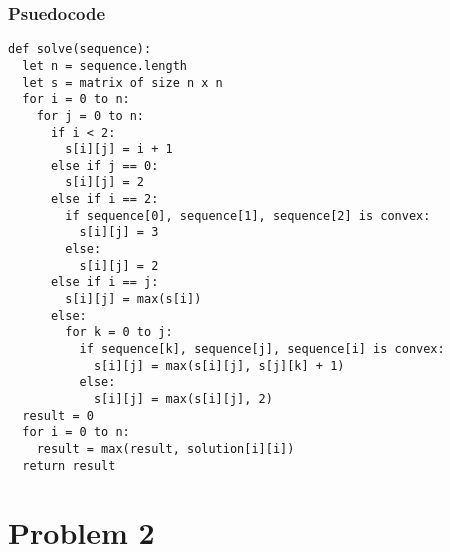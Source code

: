 \documentclass{math}
\begin{document}
\subsubsection*{Psuedocode}
\begin{lstlisting}
def solve(sequence):
  let n = sequence.length
  let s = matrix of size n x n
  for i = 0 to n:
    for j = 0 to n:
      if i < 2:
        s[i][j] = i + 1
      else if j == 0:
        s[i][j] = 2
      else if i == 2:
        if sequence[0], sequence[1], sequence[2] is convex:
          s[i][j] = 3
        else:
          s[i][j] = 2
      else if i == j:
        s[i][j] = max(s[i])
      else:
        for k = 0 to j:
          if sequence[k], sequence[j], sequence[i] is convex:
            s[i][j] = max(s[i][j], s[j][k] + 1)
          else:
            s[i][j] = max(s[i][j], 2)
  result = 0
  for i = 0 to n:
    result = max(result, solution[i][i])
  return result
\end{lstlisting}

\section*{Problem 2}
\end{document}
